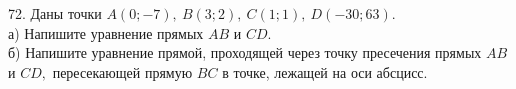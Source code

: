 72. Даны точки $A(0;-7),\ B(3;2),\ C(1;1),\ D(-30;63).$\\
а) Напишите уравнение прямых $AB$ и $CD.$\\
б) Напишите уравнение прямой, проходящей через точку пресечения прямых $AB$ и $CD,$ пересекающей прямую $BC$ в точке, лежащей на оси абсцисс.\\

